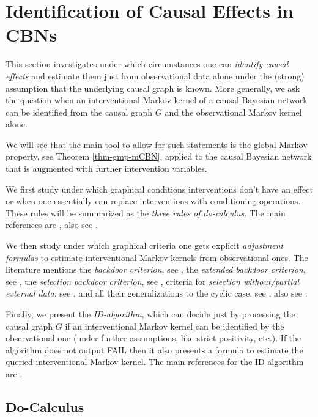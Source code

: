 \section{Identification of Causal Effects in CBNs}

This section investigates under which circumstances one can \emph{identify causal effects} and estimate them just from observational data alone under the (strong) assumption that the underlying causal graph is known. More generally, we ask the question when an interventional Markov kernel of a causal Bayesian network can be identified from the causal graph $G$ and the observational Markov kernel alone.

We will see that the main tool to allow for such statements is the global Markov property, see Theorem \ref{thm-gmp-mCBN}, applied to the causal Bayesian network that is augmented with further intervention variables.

We first study under which graphical conditions interventions don't have an effect or when one essentially can replace interventions with conditioning operations. These rules will be summarized as the \emph{three rules of do-calculus}. The main references are \cite{Pearl93as,Pearl93bs,Pearl09}, also see \cite{Pearl95s,FM20,For21}.

We then study under which graphical criteria one gets explicit \emph{adjustment formulas} to estimate interventional Markov kernels from observational ones. The literature mentions the \emph{backdoor criterion}, see \cite{Pearl93as,Pearl93bs,Pearl09}, 
the \emph{extended backdoor criterion}, see \cite{PearlPaz13,SWR10s}, the \emph{selection backdoor criterion}, see \cite{BTP14s},
criteria for \emph{selection without/partial external data}, see \cite{CB17s,CTB18s}, and all their generalizations to the cyclic case,  see \cite{FM20}, also see \cite{SP06s,PTKM15s,For21}.

Finally, we present the \emph{ID-algorithm}, which can decide just by processing the causal graph $G$ if an interventional Markov kernel can be identified by the observational one (under further assumptions, like strict positivity, etc.). If the algorithm does not output FAIL then it also presents a formula to estimate the queried interventional Markov kernel. 
The main references for the ID-algorithm are \cite{Pearl09,GP95s,Tian2002,TP02s,Tian04s,SP06,HV06s,HV08s,RERS17,FM20}.




\subsection{Do-Calculus}

